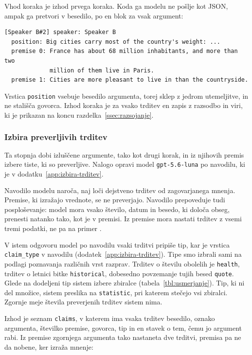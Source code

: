\documentclass[a4paper, 12pt]{book}
\begin{document}
Vhod koraka je izhod prvega koraka. Koda ga modelu ne pošlje kot JSON, ampak ga pretvori v besedilo, po en blok za vsak argument:

\begin{lstlisting}[basicstyle=\ttfamily\scriptsize,breaklines=true]
[Speaker B#2] speaker: Speaker B
  position: Big cities carry most of the country's weight: ...
  premise 0: France has about 68 million inhabitants, and more than two
             million of them live in Paris.
  premise 1: Cities are more pleasant to live in than the countryside.
\end{lstlisting}

Vrstica \texttt{position} vsebuje besedilo argumenta, torej sklep z jedrom utemeljitve, in ne stališča govorca. Izhod koraka je za vsako trditev en zapis z razsodbo in viri, ki je prikazan na koncu razdelka~\ref{ssec:razsojanje}.

\subsubsection{Izbira preverljivih trditev}
\label{ssec:claim-extraction-fc}

Ta stopnja dobi izluščene argumente, tako kot drugi korak, in iz njihovih premis izbere tiste, ki so preverljive. Nalogo opravi model \texttt{gpt-5.6-luna} po navodilu, ki je v dodatku~\ref{app:izbira-trditev}.

Navodilo modelu naroča, naj loči dejstveno trditev od zagovarjanega mnenja. Premise, ki izražajo vrednote, se ne preverjajo. Navodilo prepoveduje tudi posploševanje: model mora vsako število, datum in besedo, ki določa obseg, prenesti natanko tako, kot je v premisi. Iz premise  mora nastati trditev z vsemi tremi podatki, ne pa na primer .

V istem odgovoru model po navodilu vsaki trditvi pripiše tip, kar je vrstica \texttt{claim\_type} v navodilu (dodatek~\ref{app:izbira-trditev}). Tipe smo izbrali sami na podlagi poznavanja različnih vrst razprav. Trditev o številu obolelih je \texttt{health}, trditev o letnici bitke \texttt{historical}, dobesedno povzemanje tujih besed \texttt{quote}. Glede na dodeljeni tip sistem izbere zbiralce (tabela~\ref{tbl:usmerjanje}). Tip, ki ni del množice, sistem preslika na \texttt{statistic}, pri katerem stečejo vsi zbiralci. Zgornje meje števila preverjenih trditev sistem nima.

Izhod je seznam \texttt{claims}, v katerem ima vsaka trditev besedilo, oznako argumenta, številko premise, govorca, tip in en stavek o tem, čemu jo argument rabi. Iz premise  zgornjega argumenta tako nastaneta dve trditvi, premisa  pa ne da nobene, ker izraža mnenje:
\end{document}
